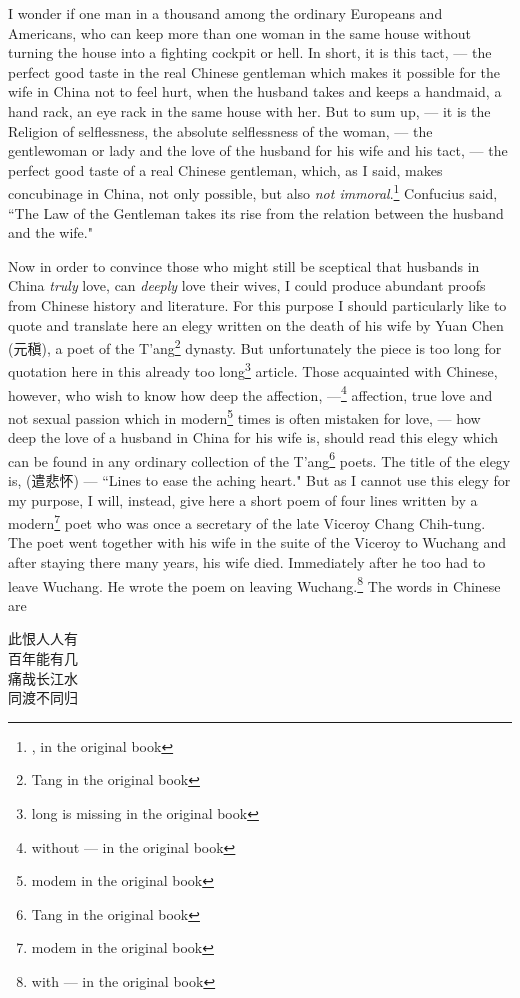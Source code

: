 I wonder if one man in a thousand among the ordinary Europeans and Americans, who can keep more than one woman in the same house without turning the house into a fighting cockpit or hell.
In short, it is this tact, --- the perfect good taste in the real Chinese gentleman which makes it possible for the wife in China not to feel hurt, when the husband takes and keeps a handmaid, a hand rack, an eye rack in the same house with her.
But to sum up, --- it is the Religion of selflessness, the absolute selflessness of the woman, --- the gentlewoman or lady and the love of the husband for his wife and his tact, --- the perfect good taste of a real Chinese gentleman, which, as I said, makes concubinage in China, not only possible, but also \emph{not immoral}.\footnote{, in the original book} Confucius said, ``The Law of the Gentleman takes its rise from the relation between the husband and the wife."

Now in order to convince those who might still be sceptical that husbands in China \emph{truly} love, can \emph{deeply} love their wives, I could produce abundant proofs from Chinese history and literature.
For this purpose I should particularly like to quote and translate here an elegy written on the death of his wife by Yuan Chen (元稹), a poet of the T'ang\footnote{Tang in the original book} dynasty.
But unfortunately the piece is too long for quotation here in this already too long\footnote{long is missing in the original book} article.
Those acquainted with Chinese, however, who wish to know how deep the affection, ---\footnote{without --- in the original book} affection, true love and not sexual passion which in modern\footnote{modem in the original book} times is often mistaken for love, --- how deep the love of a husband in China for his wife is, should read this elegy which can be found in any ordinary collection of the T'ang\footnote{Tang in the original book} poets.
The title of the elegy is, (遣悲怀) --- ``Lines to ease the aching heart." 
But as I cannot use this elegy for my purpose, I will, instead, give here a short poem of four lines written by a modern\footnote{modem in the original book} poet who was once a secretary of the late Viceroy Chang Chih-tung.
The poet went together with his wife in the suite of the Viceroy to Wuchang and after staying there  many years, his wife died.
Immediately after he too had to leave Wuchang.
He wrote the poem on leaving Wuchang.\footnote{with --- in the original book} 
The words in Chinese are
\begin{center}
   此恨人人有\\
   百年能有几\\
   痛哉长江水\\
   同渡不同归
\end{center}

